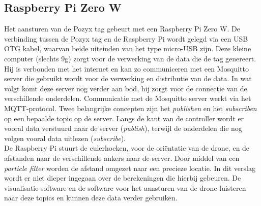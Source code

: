 \subsection{Raspberry Pi Zero W} \label{sec:zerow}
Het aansturen van de Pozyx tag gebeurt met een Raspberry Pi Zero W. De verbinding tussen de Pozyx tag en de Raspberry Pi wordt gelegd via een USB OTG kabel, waarvan beide uiteinden van het type micro-USB zijn. Deze kleine computer (slechts 9g) zorgt voor de verwerking van de data die de tag genereert. Hij is verbonden met het internet en kan zo communiceren met een Mosquitto server die gebruikt wordt voor de verwerking en distributie van de data. In wat volgt komt deze server nog verder aan bod, hij zorgt voor de connectie van de verschillende onderdelen. Communicatie met de Mosquitto server werkt via het MQTT-protocol. Twee belangrijke concepten zijn het \textit{publishen} en het \textit{subscriben} op een bepaalde topic op de server. Langs de kant van de controller wordt er vooral data verstuurd naar de server (\textit{publish}), terwijl de onderdelen die nog volgen vooral data uitlezen (\textit{subscribe}). \\

De Raspberry Pi stuurt de eulerhoeken, voor de ori\"entatie van de drone, en de afstanden naar de verschillende ankers naar de server. Door middel van een \textit{particle filter} worden de afstand omgezet naar een precieze locatie. In dit verslag wordt er niet dieper ingegaan over de berekeningen die hierbij gebeuren. De visualisatie-software en de software voor het aansturen van de drone luisteren naar deze topics en kunnen deze data verder gebruiken.


